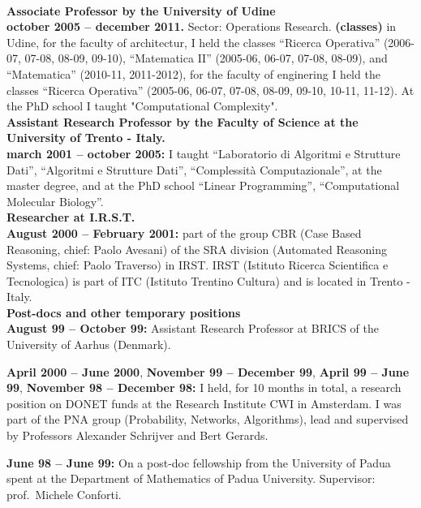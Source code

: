 \documentclass[10pt]{article}
\newcommand{\voice}[1] { \bigskip \medskip \noindent {\Large \bf #1} \medskip\\ }
\newcommand{\subvoice}[1] { {\large \bf #1} \smallskip\\ }
\begin{document}
\vspace{1.8mm}

\voice{{\LARGE Work Experience}}

\subvoice{Associate Professor by the
          University of Udine}
{\bf october 2005 -- december 2011.}
Sector: Operations Research.
{\bf (classes)} in Udine,
for the faculty of architectur,
I held the classes ``Ricerca Operativa''
(2006-07, 07-08, 08-09, 09-10),
``Matematica II'' (2005-06, 06-07, 07-08, 08-09),
and ``Matematica'' (2010-11, 2011-2012),
for the faculty of enginering I held the classes ``Ricerca Operativa''
(2005-06, 06-07, 07-08, 08-09, 09-10, 10-11, 11-12).
At the PhD school I taught "Computational Complexity".\\


\subvoice{Assistant Research Professor
          by the Faculty of Science
          at the University of Trento - Italy.}
{\bf march 2001 -- october 2005:}
I taught ``Laboratorio di Algoritmi e Strutture Dati'',
``Algoritmi e Strutture Dati'',
``Complessit\`a Computazionale'',
at the master degree,
and at the PhD school
``Linear Programming'',
``Computational Molecular Biology''.\\



\subvoice{Researcher at I.R.S.T.}
{\bf August 2000 -- February 2001:}
part of the group CBR (Case Based Reasoning, chief: Paolo Avesani)
of the SRA division
(Automated Reasoning Systems, chief: Paolo Traverso) in IRST.
IRST (Istituto Ricerca Scientifica e Tecnologica)
is part of ITC (Istituto Trentino Cultura)
and is located in Trento - Italy.\\


\subvoice{Post-docs and other temporary positions}
{\bf August 99 -- October 99:}
     Assistant Research Professor at BRICS
     of the University of Aarhus (Denmark). 

\noindent
{\bf April 2000 -- June 2000},
{\bf November 99 -- December 99},
{\bf April 99 -- June 99},
{\bf November 98 -- December 98:}
      I held, for 10 months in total,
      a research position on DONET funds
      at the Research Institute CWI in Amsterdam.
      I was part of the PNA group (Probability, Networks, Algorithms),
      lead and supervised by Professors Alexander Schrijver
      and Bert Gerards.

\noindent
{\bf June 98 -- June 99:}
On a post-doc fellowship
from the University of Padua
spent at the Department of Mathematics
of Padua University.
Supervisor: prof.~Michele Conforti.\\
\end{document}

